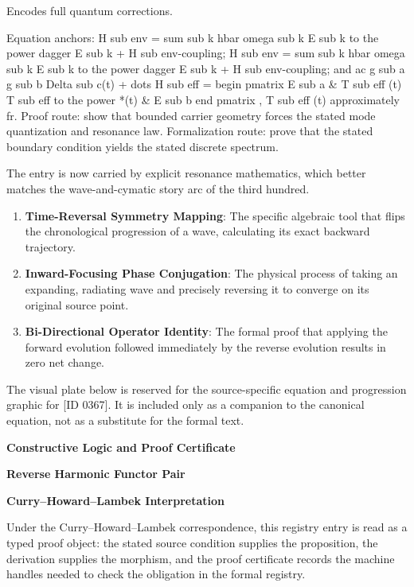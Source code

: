 Encodes full quantum corrections.

Equation anchors: H sub env = sum sub k hbar omega sub k E sub k to the power dagger E sub k + H sub env-coupling; H sub env = sum sub k hbar omega sub k E sub k to the power dagger E sub k + H sub env-coupling; and ac g sub a g sub b Delta sub c(t) + dots H sub eff = begin pmatrix E sub a \& T sub eff (t) T sub eff to the power *(t) \& E sub b end pmatrix , T sub eff (t) approximately fr. Proof route: show that bounded carrier geometry forces the stated mode quantization and resonance law. Formalization route: prove that the stated boundary condition yields the stated discrete spectrum.

The entry is now carried by explicit resonance mathematics, which better matches the wave-and-cymatic story arc of the third hundred.
\endgroup

\begin{enumerate}[leftmargin=1.6em,itemsep=6pt,topsep=4pt]
\item \textbf{Time-Reversal Symmetry Mapping}: The specific algebraic tool that flips the chronological progression of a wave, calculating its exact backward trajectory.
\item \textbf{Inward-Focusing Phase Conjugation}: The physical process of taking an expanding, radiating wave and precisely reversing it to converge on its original source point.
\item \textbf{Bi-Directional Operator Identity}: The formal proof that applying the forward evolution followed immediately by the reverse evolution results in zero net change.
\end{enumerate}

\begingroup\footnotesize\sloppy
The visual plate below is reserved for the source-specific equation and progression graphic for [ID 0367]. It is included only as a companion to the canonical equation, not as a substitute for the formal text.
\par\endgroup
\ifTZPDarkEdition
{}
\fi

\clearpage
\begingroup\tzpsupportsetup
\noindent\textbf{\fontsize{10.8pt}{12.8pt}\selectfont [ID 0367] Constructive Logic and Proof Certificate}\par
\noindent\textbf{\fontsize{10pt}{12pt}\selectfont Reverse Harmonic Functor Pair}\par
\vspace{0.45em}
\begingroup
\footnotesize
\setlength{\parskip}{0.22em}
\setlength{\parindent}{0pt}
\noindent\textbf{Curry--Howard--Lambek Interpretation}\par
Under the Curry--Howard--Lambek correspondence, this registry entry is read as a typed proof
object: the stated source condition supplies the proposition, the derivation supplies the
morphism, and the proof certificate records the machine handles needed to check the obligation
in the formal registry.

